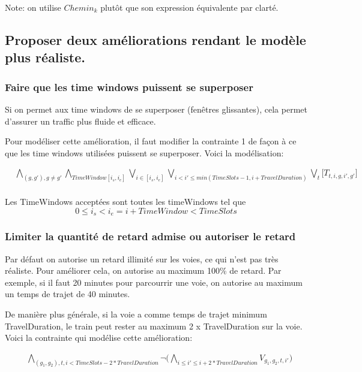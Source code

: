 \documentclass[a4paper]{article}
\begin{document}
Note: on utilise $Chemin_k$ plutôt que son expression équivalente par clarté.

\subsection{Proposer deux améliorations rendant le modèle plus réaliste.}

\subsubsection{Faire que les time windows puissent se superposer}

Si on permet aux time windows de se superposer (fenêtres glissantes), cela permet d'assurer un traffic plus fluide et efficace.

Pour modéliser cette amélioration, il faut modifier la contrainte 1 de façon à ce que les time windows utilisées puissent se superposer. Voici la modélisation:

   \begin{equation*}
    \begin{split}
      & 
      \bigwedge_{(g,g'), g \neq g'} 
      \bigwedge_{TimeWindow [i_s,i_e]}
      \bigvee_{i \in [i_s,i_e]}
      \bigvee_{i < i' \leq min(TimeSlots - 1, i + TravelDuration)}
      \bigvee_{t}
      \big[T_{t,i,g,i', g'}] \\
    \end{split}
    \end{equation*}
    
Les TimeWindows acceptées sont toutes les timeWindows tel que 
$$0 \leq i_s < i_e = i + TimeWindow < TimeSlots$$

\subsubsection{Limiter la quantité de retard admise ou autoriser le retard}

Par défaut on autorise un retard illimité sur les voies, ce qui n'est pas très réaliste. Pour améliorer cela, on autorise au maximum 100\% de retard. Par exemple, si il faut 20 minutes pour parcourrir une voie, on autorise au maximum un temps de trajet de 40 minutes.

De manière plus générale, si la voie a comme temps de trajet minimum TravelDuration, le train peut rester au maximum 2 x TravelDuration sur la voie. Voici la contrainte qui modélise cette amélioration: 

\begin{equation*}
    \begin{split}
      & \bigwedge_{(g_1, g_2), t, i < TimeSlots - 2 * TravelDuration} 
        \neg \big( 
        \bigwedge_{i \leq i' \leq i + 2 * TravelDuration} 
        V_{g_1, g_2, t, i'} \big) \\
    \end{split}
\end{equation*}
\end{document}
